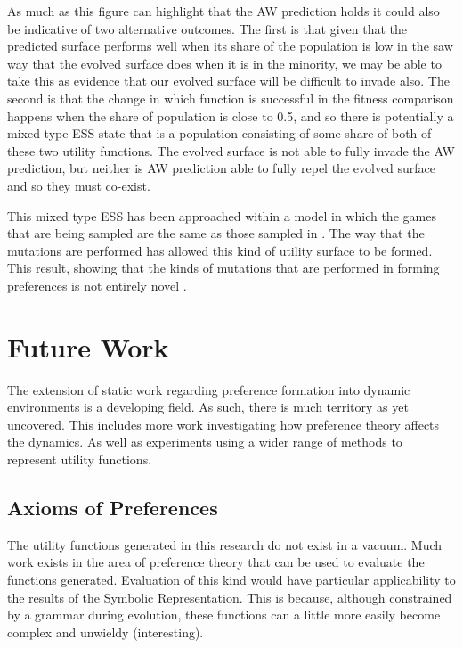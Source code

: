 \documentclass[11pt]{book}
\newcommand*{\np}{\par\noindent\newline}
\begin{document}
\np As much as this figure can highlight that the AW prediction holds it could also be indicative of two alternative outcomes.
The first is that given that the predicted surface performs well when its share of the population is low in the saw way that the evolved surface does when it is in the minority,
we may be able to take this as evidence that our evolved surface will be difficult to invade also.
The second is that the change in which function is successful in the fitness comparison happens when the share of population is close to 0.5,
and so there is potentially a mixed type ESS state that is a population consisting of some share of both of these two utility functions.
The evolved surface is not able to fully invade the AW prediction, but neither is AW prediction able to fully repel the evolved surface and so they must co-exist.

\np This mixed type ESS has been approached within a model in which the games that are being sampled are the same as those sampled in \citet{alger_generalization_2012}.
The way that the mutations are performed has allowed this kind of utility surface to be formed.
This result, showing that the kinds of mutations that are performed in forming preferences is not entirely novel \citep{garcia_structure_2012}.


\section{Future Work}

The extension of static work regarding preference formation into dynamic environments is a developing field.
As such, there is much territory as yet uncovered.
This includes more work investigating how preference theory affects the dynamics.
As well as experiments using a wider range of methods to represent utility functions.


\subsection{Axioms of Preferences}
The utility functions generated in this research do not exist in a vacuum.
Much work exists in the area of preference theory that can be used to evaluate the functions generated.
Evaluation of this kind would have particular applicability to the results of the Symbolic Representation.
This is because, although constrained by a grammar during evolution, these functions can a little more easily become complex and unwieldy (interesting).
\end{document}
